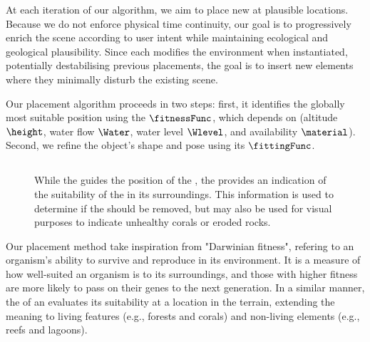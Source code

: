 At each iteration of our algorithm, we aim to place new  at plausible locations. Because we do not enforce physical time continuity, our goal is to progressively enrich the scene according to user intent while maintaining ecological and geological plausibility.
Since each  modifies the environment when instantiated, potentially destabilising previous placements, the goal is to insert new elements where they minimally disturb the existing scene.

Our placement algorithm proceeds in two steps: first, it identifies the globally most suitable position using the  $\fitnessFunc$, which depends on  (altitude $\height$, water flow $\Water$, water level $\Wlevel$, and  availability $\material$). Second, we refine the object's shape and pose using its  $\fittingFunc$.


\subsection{}
\label{sec:env-obj-fitness-func}

\begin{figure}
    \caption{While the  guides the position of the , the  provides an indication of the suitability of the  in its surroundings. This information is used to determine if the  should be removed, but may also be used for visual purposes to indicate unhealthy corals or eroded rocks.}
    \label{fig:env-obj-procedural-erosion}
\end{figure}

Our placement method take inspiration from "Darwinian fitness", refering to an organism's ability to survive and reproduce in its environment. It is a measure of how well-suited an organism is to its surroundings, and those with higher fitness are more likely to pass on their genes to the next generation. In a similar manner, the  of an  evaluates its suitability at a location in the terrain, extending the meaning to living features (e.g., forests and corals) and non-living elements (e.g., reefs and lagoons).

